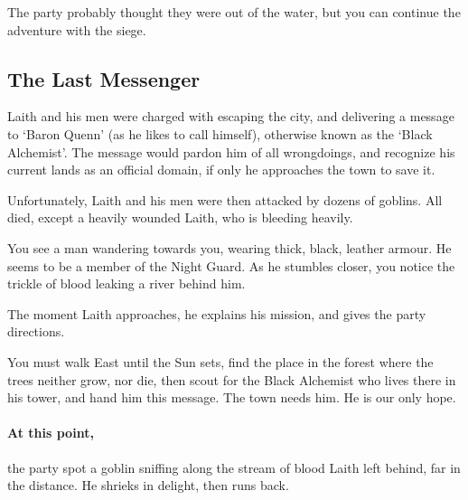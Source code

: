 \begin{multicols}{2}

\noindent
The party probably thought they were out of the water, but you can continue the adventure with the siege.

\subsection{The Last Messenger}

\begin{exampletext}

	Laith and his men were charged with escaping the city, and delivering a message to `Baron Quenn' (as he likes to call himself), otherwise known as the `Black Alchemist'.
	The message would pardon him of all wrongdoings, and recognize his current lands as an official domain, if only he approaches the town to save it.

	Unfortunately, Laith and his men were then attacked by dozens of goblins.
	All died, except a heavily wounded Laith, who is bleeding heavily.

\end{exampletext}

\begin{boxtext}

	You see a man wandering towards you, wearing thick, black, leather armour.
	He seems to be a member of the Night Guard.
	As he stumbles closer, you notice the trickle of blood leaking a river behind him.

\end{boxtext}

The moment Laith approaches, he explains his mission, and gives the party directions.

\begin{speechtext}

	You must walk East until the Sun sets, find the place in the forest where the trees neither grow, nor die, then scout for the Black Alchemist who lives there in his tower, and hand him this message.
	The town needs him.
	He is our only hope.

\end{speechtext}

\paragraph{At this point,}
the party spot a goblin sniffing along the stream of blood Laith left behind, far in the distance.
He shrieks in delight, then runs back.


\end{multicols}
